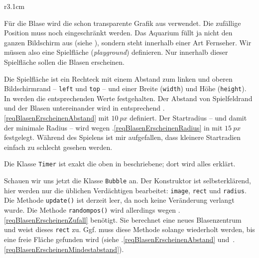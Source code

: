 \begin{wrapfigure}[6]{r}{3.1cm}%
	\begin{center}%
		\vspace{-1cm}%
	\end{center}%
\end{wrapfigure}%
Für die Blase wird die schon transparente Grafik aus  verwendet. Die zufällige Position muss noch eingeschränkt werden. Das Aquarium füllt ja nicht den ganzen Bildschirm aus (siehe ), sondern steht innerhalb einer Art Fernseher. Wir müssen also eine Spielfläche (\emph{playground}) definieren. Nur innerhalb dieser Spielfläche sollen die Blasen erscheinen.

Die Spielfläche ist ein Rechteck mit einem Abstand zum linken und oberen Bildschirmrand -- \texttt{left} und \texttt{top} -- und einer Breite (\texttt{width}) und Höhe (\texttt{height}). In  werden die entsprechenden Werte festgehalten. Der Abstand von Spielfeldrand und der Blasen untereinander wird in  entsprechend .\ref{reqBlasenErscheinenAbstand} mit $10~px$ definiert. Der Startradius -- und damit der minimale Radius -- wird wegen .\ref{reqBlasenErscheinenRadius} in  mit $15~px$ festgelegt. Während des Spielens ist mir aufgefallen, dass kleinere Startradien einfach zu schlecht gesehen werden.


Die Klasse \texttt{Timer} ist exakt die oben in  beschriebene; dort wird alles erklärt.


Schauen wir uns jetzt die Klasse \texttt{Bubble} an. Der Konstruktor ist selbsterklärend, hier werden nur die üblichen Verdächtigen bearbeitet: \texttt{image}, \texttt{rect} und \texttt{radius}. Die Methode \texttt{update()} ist derzeit leer, da noch keine Veränderung verlangt wurde. Die Methode \texttt{randompos()} wird allerdings wegen .\ref{reqBlasenErscheinenZufall} benötigt. Sie berechnet eine neues Blasenzentrum und weist dieses \texttt{rect} zu. Ggf. muss diese Methode solange wiederholt werden, bis eine freie Fläche gefunden wird (siehe .\ref{reqBlasenErscheinenAbstand} und~.\ref{reqBlasenErscheinenMindestabstand}).

